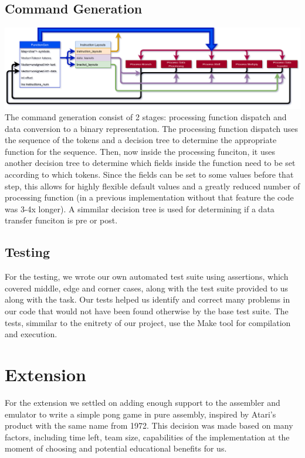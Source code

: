 \documentclass[11pt]{article}
\begin{document}
\subsection*{Command Generation}
\includegraphics[width=\textwidth]{commandgen}
The command generation consist of 2 stages: processing function dispatch and data conversion to a binary representation. The processing function dispatch uses the sequence of the tokens and a decision tree to determine the appropriate function for the sequence. Then, now inside the processing funciton, it uses another decision tree to determine which fields inside the function need to be set according to which tokens. Since the fields can be set to some values before that step, this allows for highly flexible default values and a greatly reduced number of processing function (in a previous implementation without that feature the code was 3-4x longer). A simmilar decision tree is used for determining if a data transfer funciton is pre or post.
\subsection*{Testing}
For the testing, we wrote our own automated test suite using assertions, which covered middle, edge and corner cases, along with the test suite provided to us along with the task. Our tests helped us identify and correct many problems in our code that would not have been found otherwise by the base test suite. The tests, simmilar to the enitrety of our project, use the Make tool for compilation and execution.
\section{Extension}
For the extension we settled on adding enough support to the assembler and emulator to write a simple pong game in pure assembly, inspired by Atari's product with the same name from 1972. This decision was made based on many factors, including time left, team size, capabilities of the implementation at the moment of choosing and potential educational benefits for us.
\end{document}
